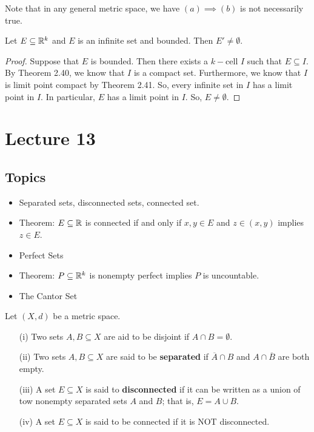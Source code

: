 \documentclass[a4paper]{report}
\begin{document}
\begin{remark}
    Note that in any general metric space, we have \( (a) \implies (b) \) is not necessarily true.
\end{remark}

\begin{theorem}
 Let \( E \subseteq \mathbb{R}^{k }  \) and \( E  \) is an infinite set and bounded. Then \( E' \neq \emptyset \).   
\end{theorem}
\begin{proof}
Suppose that \( E  \) is bounded. Then there exists a \( k- \)cell \( I  \) such that \( E \subseteq  I  \). By Theorem 2.40, we know that \( I  \) is a compact set. Furthermore, we know that \( I  \) is limit point compact by Theorem 2.41. So, every infinite set in \( I  \) has a limit point in \( I  \). In particular, \( E  \) has a limit point in \( I  \). So, \( E \neq \emptyset \).
\end{proof}

\section{Lecture 13}

\subsection{Topics}

\begin{itemize}
    \item Separated sets, disconnected sets, connected set.
    \item Theorem: \( E \subseteq \mathbb{R}   \) is connected if and only if \( x,y \in E  \) and \( z \in (x,y) \) implies \( z \in E  \).
    \item Perfect Sets
    \item Theorem: \( P \subseteq \mathbb{R}^{k} \) is nonempty perfect implies \( P  \) is uncountable.
    \item The Cantor Set
\end{itemize}


\begin{definition}
    Let \( (X,d) \) be a metric space. 
    \begin{enumerate}
        \item[(i)] Two sets \( A,B \subseteq X   \) are aid to be disjoint if \( A \cap B = \emptyset \).
        \item[(ii)] Two sets \( A,B \subseteq X  \) are said to be \textbf{separated} if \( \overline{A} \cap B  \) and \( A \cap \overline{B}  \) are both empty.
        \item [(iii)] A set \( E \subseteq X   \) is said to \textbf{disconnected} if it can be written as a union of tow nonempty separated sets \( A  \) and \( B  \); that is, \( E = A \cup B  \).
        \item[(iv)] A set \( E \subseteq X  \) is said to be connected if it is NOT disconnected.
    \end{enumerate}
\end{definition}
\end{document}
